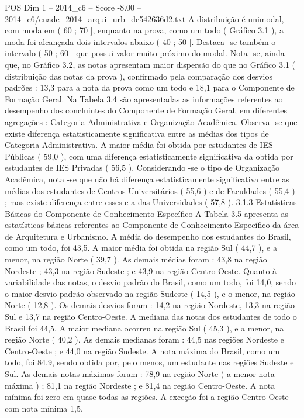 \begin{textsample}{POS Dim 1 – 2014\_c6 – Score -8.00 – 2014\_c6/enade\_2014\_arqui\_urb\_dc542636d2.txt}
A distribuição é unimodal, com moda em ( 60 ; 70 ], enquanto na prova, como um todo ( Gráfico 3.1 ), a moda foi alcançada dois intervalos abaixo ( 40 ; 50 ].
Destaca -se também o intervalo ( 50 ; 60 ] que possui valor muito próximo do modal.
Nota -se, ainda que, no Gráfico 3.2, as notas apresentam maior dispersão do que no Gráfico 3.1 ( distribuição das notas da prova ), confirmado pela comparação dos desvios padrões : 13,3 para a nota da prova como um todo e 18,1 para o Componente de Formação Geral.
Na Tabela 3.4 são apresentadas as informações referentes ao desempenho dos concluintes do Componente de Formação Geral, em diferentes agregações : Categoria Administrativa e Organização Acadêmica.
Observa -se que existe diferença estatisticamente significativa entre as médias dos tipos de Categoria Administrativa.
A maior média foi obtida por estudantes de IES Públicas ( 59,0 ), com uma diferença estatisticamente significativa da obtida por estudantes de IES Privadas ( 56,5 ).
Considerando -se o tipo de Organização Acadêmica, nota -se que não há diferença estatisticamente significativa entre as médias dos estudantes de Centros Universitários ( 55,6 ) e de Faculdades ( 55,4 ) ; mas existe diferença entre esses e a das Universidades ( 57,8 ). 3.1.3 Estatísticas Básicas do Componente de Conhecimento Específico A Tabela 3.5 apresenta as estatísticas básicas referentes ao Componente de Conhecimento Específico da área de Arquitetura e Urbanismo.
A média do desempenho dos estudantes do Brasil, como um todo, foi 43,5.
A maior média foi obtida na região Sul ( 44,7 ), e a menor, na região Norte ( 39,7 ).
As demais médias foram : 43,8 na região Nordeste ; 43,3 na região Sudeste ; e 43,9 na região Centro-Oeste.
Quanto à variabilidade das notas, o desvio padrão do Brasil, como um todo, foi 14,0, sendo o maior desvio padrão observado na região Sudeste ( 14,5 ), e o menor, na região Norte ( 12,8 ).
Os demais desvios foram : 14,2 na região Nordeste, 13,3 na região Sul e 13,7 na região Centro-Oeste.
A mediana das notas dos estudantes de todo o Brasil foi 44,5.
A maior mediana ocorreu na região Sul ( 45,3 ), e a menor, na região Norte ( 40,2 ).
As demais medianas foram : 44,5 nas regiões Nordeste e Centro-Oeste ; e 44,0 na região Sudeste.
A nota máxima do Brasil, como um todo, foi 84,9, sendo obtida por, pelo menos, um estudante nas regiões Sudeste e Sul.
As demais notas máximas foram : 78,9 na região Norte ( a menor nota máxima ) ; 81,1 na região Nordeste ; e 81,4 na região Centro-Oeste.
A nota mínima foi zero em quase todas as regiões.
A exceção foi a região Centro-Oeste com nota mínima 1,5.

\end{textsample}
